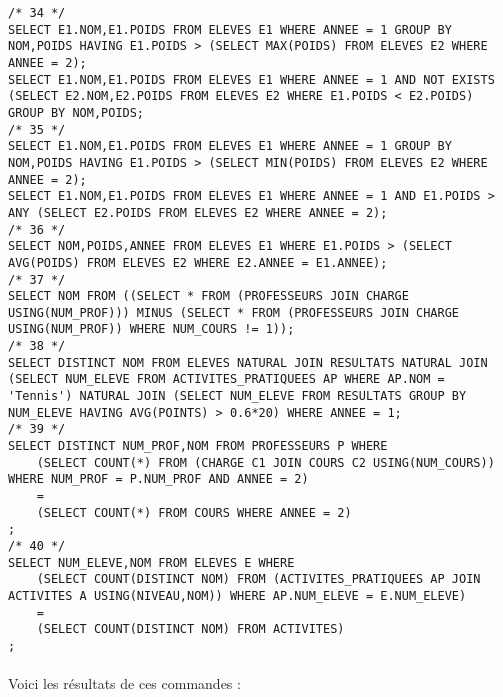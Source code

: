 \documentclass{report}
\begin{document}
\begin{lstlisting}
/* 34 */
SELECT E1.NOM,E1.POIDS FROM ELEVES E1 WHERE ANNEE = 1 GROUP BY NOM,POIDS HAVING E1.POIDS > (SELECT MAX(POIDS) FROM ELEVES E2 WHERE ANNEE = 2);
SELECT E1.NOM,E1.POIDS FROM ELEVES E1 WHERE ANNEE = 1 AND NOT EXISTS (SELECT E2.NOM,E2.POIDS FROM ELEVES E2 WHERE E1.POIDS < E2.POIDS) GROUP BY NOM,POIDS;
/* 35 */
SELECT E1.NOM,E1.POIDS FROM ELEVES E1 WHERE ANNEE = 1 GROUP BY NOM,POIDS HAVING E1.POIDS > (SELECT MIN(POIDS) FROM ELEVES E2 WHERE ANNEE = 2);
SELECT E1.NOM,E1.POIDS FROM ELEVES E1 WHERE ANNEE = 1 AND E1.POIDS > ANY (SELECT E2.POIDS FROM ELEVES E2 WHERE ANNEE = 2);
/* 36 */
SELECT NOM,POIDS,ANNEE FROM ELEVES E1 WHERE E1.POIDS > (SELECT AVG(POIDS) FROM ELEVES E2 WHERE E2.ANNEE = E1.ANNEE);
/* 37 */
SELECT NOM FROM ((SELECT * FROM (PROFESSEURS JOIN CHARGE USING(NUM_PROF))) MINUS (SELECT * FROM (PROFESSEURS JOIN CHARGE USING(NUM_PROF)) WHERE NUM_COURS != 1));
/* 38 */
SELECT DISTINCT NOM FROM ELEVES NATURAL JOIN RESULTATS NATURAL JOIN (SELECT NUM_ELEVE FROM ACTIVITES_PRATIQUEES AP WHERE AP.NOM = 'Tennis') NATURAL JOIN (SELECT NUM_ELEVE FROM RESULTATS GROUP BY NUM_ELEVE HAVING AVG(POINTS) > 0.6*20) WHERE ANNEE = 1;
/* 39 */
SELECT DISTINCT NUM_PROF,NOM FROM PROFESSEURS P WHERE
    (SELECT COUNT(*) FROM (CHARGE C1 JOIN COURS C2 USING(NUM_COURS)) WHERE NUM_PROF = P.NUM_PROF AND ANNEE = 2)
    =
    (SELECT COUNT(*) FROM COURS WHERE ANNEE = 2)
;
/* 40 */
SELECT NUM_ELEVE,NOM FROM ELEVES E WHERE
    (SELECT COUNT(DISTINCT NOM) FROM (ACTIVITES_PRATIQUEES AP JOIN ACTIVITES A USING(NIVEAU,NOM)) WHERE AP.NUM_ELEVE = E.NUM_ELEVE)
    =
    (SELECT COUNT(DISTINCT NOM) FROM ACTIVITES)
;
\end{lstlisting}

\paragraph{}Voici les résultats de ces commandes :
\end{document}
